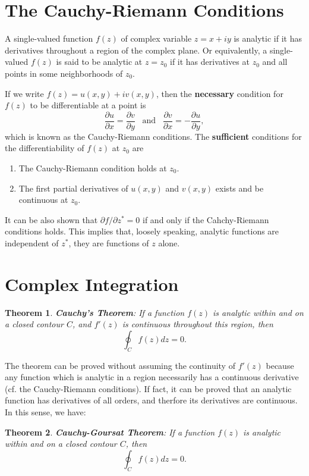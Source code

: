 \documentclass[11pt, letterpaper]{article}
\newtheorem{thm}{Theorem}
\begin{document}
\section{The Cauchy-Riemann Conditions}
A single-valued function $f(z)$ of complex variable $z=x+iy$ is analytic if it has derivatives throughout a region of the
complex plane. Or equivalently, a single-valued $f(z)$ is said to be analytic at $z=z_0$ if it has derivatives at $z_0$ and
all points in some neighborhoods of $z_0$.

If we write $f(z) = u(x,y) + iv(x,y)$, then the {\bf necessary} condition for $f(z)$ to be differentiable at a point is
\begin{equation}
	\frac{\partial u}{\partial x} = \frac{\partial v}{\partial y}\,\,\,\,\,\mbox{and}\,\,\,\,\,
	\frac{\partial v}{\partial x} = -\frac{\partial u}{\partial y},
\end{equation}
which is known as the Cauchy-Riemann conditions. The {\bf sufficient} conditions for the differentiability of $f(z)$ at $z_0$ are
\begin{enumerate}
	\item The Cauchy-Riemann condition holds at $z_0$.
	\item The first partial derivatives of $u(x,y)$ and $v(x,y)$ exists and be continuous at $z_0$.
\end{enumerate}
It can be also shown that $\partial f/\partial z^*=0$ if and only if the Cahchy-Riemann conditions holds. This implies that, loosely
speaking, analytic functions are independent of $z^*$, they are functions of $z$ alone.


\section{Complex Integration}
\begin{thm}
{\bf Cauchy's Theorem}: If a function $f(z)$ is analytic within and on a closed contour $C$, and $f'(z)$ is continuous throughout
this region, then
\begin{equation}
	\oint_C f(z) dz = 0.
\end{equation}
\end{thm}
The theorem can be proved without assuming the continuity of $f'(z)$ because any function which is analytic in a region
necessarily has a continuous derivative (cf. the Cauchy-Riemann conditions). If fact, it can be proved that an analytic
function has derivatives of all orders, and therfore its derivatives are continuous. In this sense, we have:
\begin{thm}
{\bf Cauchy-Goursat Theorem}: If a function $f(z)$ is analytic within and on a closed contour $C$, then
\begin{equation}
	\oint_C f(z) dz = 0.
\end{equation}
\end{thm}
\end{document}
